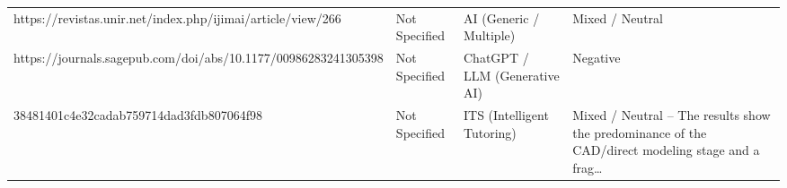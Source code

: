 \begin{table}[htbp]
\begin{tabularx}{\textwidth}{l l l X}
    https://revistas.unir.net/index.php/ijimai/article/view/266 & Not Specified & AI (Generic / Multiple) & Mixed / Neutral \\
    https://journals.sagepub.com/doi/abs/10.1177/00986283241305398 & Not Specified & ChatGPT / LLM (Generative AI) & Negative \\
    38481401c4e32cadab759714dad3fdb807064f98 & Not Specified & ITS (Intelligent Tutoring) & Mixed / Neutral – The results show the predominance of the CAD/direct modeling stage and a frag\ldots{} \\
    \bottomrule
  \end{tabularx}
\end{table}
